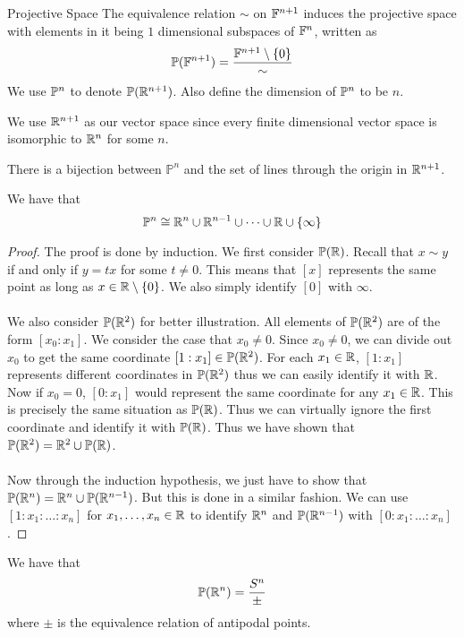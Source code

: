 \documentclass[a4paper]{article}
\begin{document}
\begin{defn}{Projective Space}{} The equivalence relation $\sim$ on $\mathbb{F}^{n+1}$ induces the projective space with elements in it being $1$ dimensional subspaces of $\mathbb{F}^n$, written as $$\mathbb{P}(\mathbb{F}^{n+1})=\frac{\mathbb{F}^{n+1}\setminus\{0\}}{\sim}$$
We use $\mathbb{P}^n$ to denote $\mathbb{P}(\mathbb{R}^{n+1})$. Also define the dimension of $\mathbb{P}^n$ to be $n$. 
\end{defn}
We use $\mathbb{R}^{n+1}$ as our vector space since every finite dimensional vector space is isomorphic to $\mathbb{R}^{n}$ for some $n$. 

\begin{prp}{}{} There is a bijection between $\mathbb{P}^n$ and the set of lines through the origin in $\mathbb{R}^{n+1}$. 
\end{prp}

\begin{prp}{}{} We have that $$\mathbb{P}^n\cong\mathbb{R}^n\cup\mathbb{R}^{n-1}\cup\dots\cup\mathbb{R}\cup\{\infty\}$$ \tcbline
\begin{proof}
The proof is done by induction. We first consider $\mathbb{P}(\mathbb{R})$. Recall that $x\sim y$ if and only if $y=tx$ for some $t\neq 0$. This means that $[x]$ represents the same point as long as $x\in\mathbb{R}\setminus\{0\}$. We also simply identify $[0]$ with $\infty$. \\~\\
We also consider $\mathbb{P}(\mathbb{R}^2)$ for better illustration. All elements of $\mathbb{P}(\mathbb{R}^2)$ are of the form $[x_0:x_1]$. We consider the case that $x_0\neq 0$. Since $x_0\neq 0$, we can divide out $x_0$ to get the same coordinate $[1:x_1]\in\mathbb{P}(\mathbb{R}^2)$. For each $x_1\in\mathbb{R}$, $[1:x_1]$ represents different coordinates in $\mathbb{P}(\mathbb{R}^2)$ thus we can easily identify it with $\mathbb{R}$. Now if $x_0=0$, $[0:x_1]$ would represent the same coordinate for any $x_1\in\mathbb{R}$. This is precisely the same situation as $\mathbb{P}(\mathbb{R})$. Thus we can virtually ignore the first coordinate and identify it with $\mathbb{P}(\mathbb{R})$. Thus we have shown that $\mathbb{P}(\mathbb{R}^2)=\mathbb{R}^2\cup\mathbb{P}(\mathbb{R})$. \\~\\
Now through the induction hypothesis, we just have to show that $\mathbb{P}(\mathbb{R}^n)=\mathbb{R}^n\cup\mathbb{P}(\mathbb{R}^{n-1})$. But this is done in a similar fashion. We can use $[1:x_1:\dots:x_n]$ for $x_1,\dots,x_n\in\mathbb{R}$ to identify $\mathbb{R}^n$ and $\mathbb{P}(\mathbb{R}^{n-1})$ with $[0:x_1:\dots:x_n]$. 
\end{proof}
\end{prp}

\begin{thm}{}{} We have that $$\mathbb{P}(\mathbb{R}^n)=\frac{S^n}{\pm}$$ where $\pm$ is the equivalence relation of antipodal points. 
\end{thm}
\end{document}
